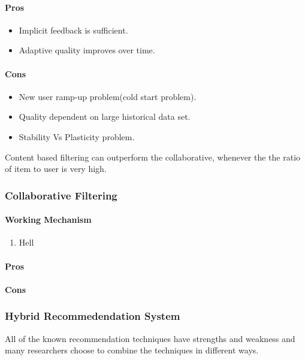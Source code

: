\paragraph{Pros}\hfill
\begin{itemize}
\item Implicit feedback is sufficient.
\item Adaptive quality improves over time.
\end{itemize}
\paragraph{Cons}\hfill
\begin{itemize}
\item New user ramp-up problem(cold start problem).
\item Quality dependent on large historical data set.
\item Stability Vs Plasticity problem.

\end{itemize}
Content based filtering can outperform the collaborative, whenever the the ratio of item to user is very high.

\subsubsection{Collaborative Filtering}
\paragraph{Working Mechanism}\hfill
\begin{enumerate}
	\item Hell
\end{enumerate}
\paragraph{Pros}\hfill
\paragraph{Cons}\hfill
\subsubsection{Hybrid Recommedendation System}
All of the known recommendation techniques have strengths and weakness and many researchers choose to combine the techniques in different ways.
